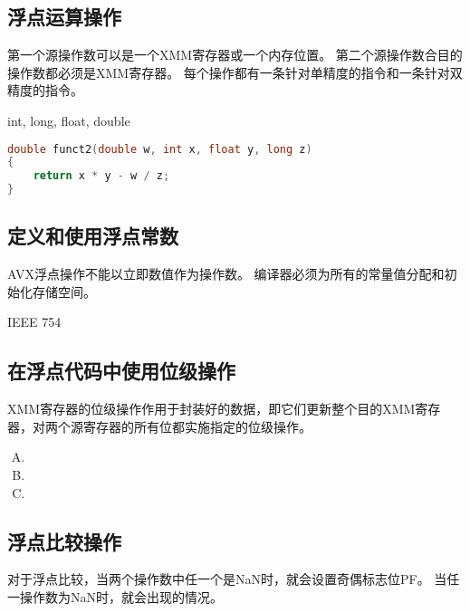 {    \subsection{浮点运算操作}
    {
        第一个源操作数可以是一个XMM寄存器或一个内存位置。
        第二个源操作数合目的操作数都必须是XMM寄存器。
        每个操作都有一条针对单精度的指令和一条针对双精度的指令。

        \begin{practicec}
            int, long, float, double
        \end{practicec}

        \begin{practicec}
            \begin{lstlisting}[language=C]
double funct2(double w, int x, float y, long z)
{
    return x * y - w / z;
}
            \end{lstlisting}
        \end{practicec}
    }

    \subsection{定义和使用浮点常数}
    {
        AVX浮点操作不能以立即数值作为操作数。
        编译器必须为所有的常量值分配和初始化存储空间。

        \begin{practicec}
            IEEE 754
        \end{practicec}
    }

    \subsection{在浮点代码中使用位级操作}
    {
        XMM寄存器的位级操作作用于封装好的数据，即它们更新整个目的XMM寄存器，对两个源寄存器的所有位都实施指定的位级操作。

        \begin{practicec}
            \begin{enumerate}[A.]
                \item {}
                \item {}
                \item {}
            \end{enumerate}
        \end{practicec}
    }

    \subsection{浮点比较操作}
    {
        对于浮点比较，当两个操作数中任一个是NaN时，就会设置奇偶标志位PF。
        当任一操作数为NaN时，就会出现的情况。

}}
